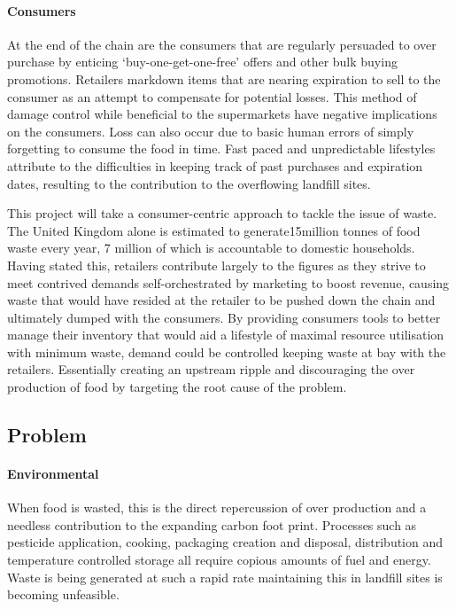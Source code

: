 \documentclass[a4paper, 11pt]{article}
\begin{document}
\paragraph{Consumers}At the end of the chain are the consumers that are regularly persuaded to over purchase by enticing `buy-one-get-one-free' offers and other bulk buying promotions. Retailers markdown items that are nearing expiration to sell  to the consumer as an attempt to compensate for potential losses. This method of damage control while beneficial to the supermarkets have negative implications on the consumers. Loss can also occur due to basic human errors of simply forgetting to consume the food in time. Fast paced and unpredictable lifestyles attribute to the difficulties in keeping track of past purchases and expiration dates, resulting to the  contribution to the overflowing landfill sites. 

\vspace{\baselineskip}

This project will take a consumer-centric approach to tackle the issue of waste. The United Kingdom alone is estimated to generate15million tonnes of food waste every year, 7 million of which is accountable to domestic households. Having stated this, retailers contribute largely to the figures as they strive to meet contrived demands self-orchestrated by marketing to boost revenue, causing waste that would have resided at the retailer to be pushed down the chain and ultimately dumped with the consumers. By providing consumers tools to better manage their inventory that would aid a lifestyle of maximal resource utilisation with minimum waste, demand could be controlled keeping waste at bay with the retailers. Essentially creating an upstream ripple and discouraging the over production of food by targeting the root cause of the problem.

\vspace{\baselineskip}
\vspace{\baselineskip}
\vspace{\baselineskip}

\subsection{Problem}
\paragraph{Environmental}When food is wasted, this is the direct repercussion of over production and a needless contribution to the expanding carbon foot print. Processes such as pesticide application, cooking, packaging creation and disposal, distribution and temperature controlled storage all require copious amounts of fuel and energy. Waste is being generated at such a rapid rate maintaining this in landfill sites is becoming unfeasible.
\end{document}
